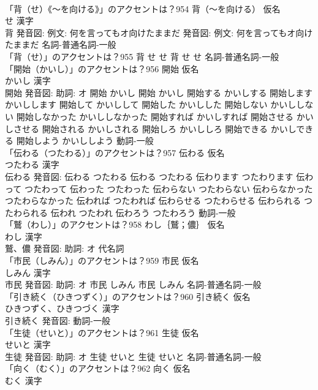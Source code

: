 \documentclass[8pt]{extreport}
\begin{document}
\begin{CJK}{UTF8}{min}
\\	「背（せ）《〜を向ける》」のアクセントは？954	背（〜を向ける） 仮名　
\\	せ 漢字　
\\	背 発音図: 例文: 何を言ってもオ向けたままだ 発音図: 例文: 何を言ってもオ向けたままだ							名詞-普通名詞-一般 
\\	「背（せ）」のアクセントは？955		背 せ せ		背 せ せ				名詞-普通名詞-一般 
\\	「開始（かいし）」のアクセントは？956	開始 仮名　
\\	かいし 漢字　
\\	開始 発音図: 助詞: オ	開始 かいし		開始 かいし 開始する かいしする 開始します かいしします 開始して かいしして 開始した かいしした 開始しない かいししない 開始しなかった かいししなかった 開始すれば かいしすれば 開始させる かいしさせる 開始される かいしされる 開始しろ かいししろ 開始できる かいしできる 開始しよう かいししよう				動詞-一般 
\\	「伝わる（つたわる）」のアクセントは？957	伝わる 仮名　
\\	つたわる 漢字　
\\	伝わる 発音図:	伝わる つたわる		伝わる つたわる 伝わります つたわります 伝わって つたわって 伝わった つたわった 伝わらない つたわらない 伝わらなかった つたわらなかった 伝われば つたわれば 伝わらせる つたわらせる 伝わられる つたわられる 伝われ つたわれ 伝わろう つたわろう				動詞-一般 
\\	「鷲（わし）」のアクセントは？958	わし｛鷲；儂｝ 仮名　
\\	わし 漢字　
\\	鷲、儂 発音図: 助詞: オ							代名詞 
\\	「市民（しみん）」のアクセントは？959	市民 仮名　
\\	しみん 漢字　
\\	市民 発音図: 助詞: オ	市民 しみん		市民 しみん				名詞-普通名詞-一般 
\\	「引き続く（ひきつずく）」のアクセントは？960	引き続く 仮名　
\\	ひきつずく、ひきつづく 漢字　
\\	引き続く 発音図:							動詞-一般 
\\	「生徒（せいと）」のアクセントは？961	生徒 仮名　
\\	せいと 漢字　
\\	生徒 発音図: 助詞: オ	生徒 せいと		生徒 せいと				名詞-普通名詞-一般 
\\	「向く（むく）」のアクセントは？962	向く 仮名　
\\	むく 漢字　

\end{CJK}
\end{document}
